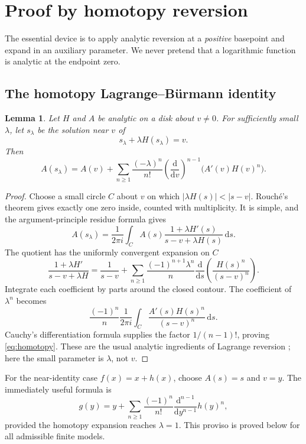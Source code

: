 \documentclass[11pt,a4paper]{article}
\newtheorem{lemma}[theorem]{Lemma}
\theoremstyle{definition}
\theoremstyle{remark}
\newcommand{\dd}{\mathrm d}
\begin{document}
\section{Proof by homotopy reversion}
\label{sec:proof}

The essential device is to apply analytic reversion at a \emph{positive}
basepoint and expand in an auxiliary parameter. We never pretend that a
logarithmic function is analytic at the endpoint zero.

\subsection{The homotopy Lagrange--B\"urmann identity}

\begin{lemma}\label{lem:homotopy}
Let $H$ and $A$ be analytic on a disk about $v\ne0$. For sufficiently small
$\lambda$, let $s_\lambda$ be the solution near $v$ of
\[
 s_\lambda+\lambda H(s_\lambda)=v.
\]
Then
\begin{equation}\label{eq:homotopy}
 A(s_\lambda)=A(v)+\sum_{n\ge1}\frac{(-\lambda)^n}{n!}
 \left(\frac{\dd}{\dd v}\right)^{n-1}
 \bigl(A'(v)H(v)^n\bigr).
\end{equation}
\end{lemma}

\begin{proof}
Choose a small circle $C$ about $v$ on which
$|\lambda H(s)|<|s-v|$. Rouch\'e's theorem gives exactly one zero inside,
counted with multiplicity. It is simple, and the argument-principle residue
formula gives
\[
 A(s_\lambda)=\frac1{2\pi i}\int_C
 A(s)\frac{1+\lambda H'(s)}{s-v+\lambda H(s)}\,\dd s.
\]
The quotient has the uniformly convergent expansion on $C$
\[
 \frac{1+\lambda H'}{s-v+\lambda H}
 =\frac1{s-v}+\sum_{n\ge1}\frac{(-1)^{n+1}\lambda^n}{n}
       \frac{\dd}{\dd s}\left(\frac{H(s)^n}{(s-v)^n}\right).
\]
Integrate each coefficient by parts around the closed contour. The coefficient
of $\lambda^n$ becomes
\[
 \frac{(-1)^n}{n}\frac1{2\pi i}\int_C
       \frac{A'(s)H(s)^n}{(s-v)^n}\,\dd s.
\]
Cauchy's differentiation formula supplies the factor $1/(n-1)!$, proving
\eqref{eq:homotopy}. These are the usual analytic ingredients of Lagrange
reversion \cite{dlmf}; here the small parameter is $\lambda$, not $v$.
\end{proof}

For the near-identity case $f(x)=x+h(x)$, choose $A(s)=s$ and $v=y$. The
immediately useful formula is
\begin{equation}\label{eq:nearidentity}
 g(y)=y+\sum_{n\ge1}\frac{(-1)^n}{n!}
       \frac{\dd^{n-1}}{\dd y^{n-1}}h(y)^n,
\end{equation}
provided the homotopy expansion reaches $\lambda=1$. This proviso is proved
below for all admissible finite models.
\end{document}
